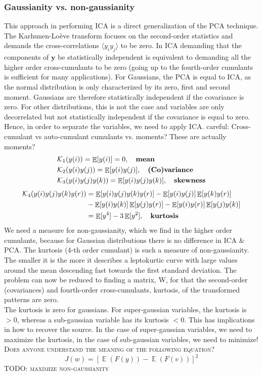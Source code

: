 \documentclass[11pt]{article}
\DeclareMathOperator{\E}{\mathbb{E}}
\begin{document}
\subsubsection{Gaussianity vs. non-gaussianity}
This approach in performing ICA is a direct generalization of the PCA technique. The Karhunen-Lo\`{e}ve transform focuses on the second-order statistics and demands the cross-correlations $\langle y_iy_j \rangle$ to be zero. In ICA demanding that the components of $\mathbf{y}$ be statistically independent is equivalent to demanding all the higher order cross-cumulants to be zero (going up to the fourth-order cumulants is sufficient for many applications).%
For Gaussians, the PCA is equal to ICA, as the normal distribution is only characterized by its zero, first and second moment. Gaussians are therefore statistically independent if the covariance is zero. For other distributions, this is not the case and variables are only decorrelated but not statistically independent if the covariance is equal to zero. Hence, in order to separate the variables, we need to apply ICA.
careful: Cross-cumulant vs auto-cumulant
cumulants vs. moments? These are actually moments?
\begin{align*}
&\mathcal{K}_1(y(i))=\E[y(i)]=0,\quad \text{\textbf{mean}}\\
&\mathcal{K}_2(y(i)y(j))=\E[y(i)y(j)],\quad \text{\textbf{(Co)variance}}\\
&\mathcal{K}_3(y(i)y(j)y(k))=\E[y(i)y(j)y(k)],\quad \text{\textbf{skewness}}
\end{align*}
\begin{align*}
\mathcal{K}_4(y(i)y(j)y(k)y(r))&=\E[y(i)y(j)y(k)y(r)]-\E[y(i)y(j)]\E[y(k)y(r)]\\
&-\E[y(i)y(k)]\E[y(j)y(r)]-\E[y(i)y(r)]\E[y(j)y(k)]\\
&=\E[y^4]-3\E[y^2],\quad \text{\textbf{kurtosis}}
\end{align*}
We need a measure for non-gaussianity, which we find in the higher order cumulants, because for Gaussian distributions there is no difference in ICA \& PCA. The kurtosis (4-th order cumulant) is such a measure of non-gaussianity. The smaller it is the more it describes a leptokurtic curve with large values around the mean descending fast towards the first standard deviation. The problem can now be reduced to finding a matrix, W, for that the second-order (covariances) and fourth-order cross-cumulants, kurtosis, of the transformed patterns are zero.\\
The kurtosis is zero for gaussians. For super-gaussian variables, the kurtosis is $ > 0$, whereas a sub-gaussian variable has its kurtosis $< 0$. This has implications in how to recover the source. In the case of super-gaussian variables, we need to maximize the kurtosis, in the case of sub-gaussian variables, we need to minimize!
\textsc{Does anyone understand the meaning of the following equation?}
\[
J(w)=[\E(F(y))-\E(F(v))]^2
\]
\textsc{TODO: maximize non-gaussianity}
\end{document}
